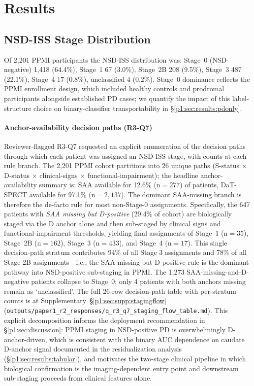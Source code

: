 \section{Results}
\label{p1:sec:results}

\subsection{NSD-ISS Stage Distribution}
Of 2{,}201 PPMI participants the NSD-ISS distribution was: Stage~0 (NSD-negative) 1{,}418 (64.4\%), Stage~1 67 (3.0\%), Stage~2B 208 (9.5\%), Stage~3 487 (22.1\%), Stage~4 17 (0.8\%), unclassified 4 (0.2\%). Stage~0 dominance reflects the PPMI enrollment design, which included healthy controls and prodromal participants alongside established PD cases; we quantify the impact of this label-structure choice on binary-classifier transportability in \S\ref{p1:sec:results:pdonly}.

\paragraph*{Anchor-availability decision paths (R3-Q7)} Reviewer-flagged R3-Q7 requested an explicit enumeration of the decision paths through which each patient was assigned an NSD-ISS stage, with counts at each rule branch. The 2{,}201 PPMI cohort partitions into 26 unique paths (S-status $\times$ D-status $\times$ clinical-signs $\times$ functional-impairment); the headline anchor-availability summary is: SAA available for 12.6\% (n${=}277$) of patients, DaT-SPECT available for 97.1\% (n${=}2{,}137$). The dominant SAA-missing branch is therefore the de-facto rule for most non-Stage-0 assignments. Specifically, the 647 patients with \emph{SAA missing but D-positive} (29.4\% of cohort) are biologically staged via the D anchor alone and then sub-staged by clinical signs and functional-impairment thresholds, yielding final assignments of Stage~1 (n${=}35$), Stage~2B (n${=}162$), Stage~3 (n${=}433$), and Stage~4 (n${=}17$). This single decision-path stratum contributes 94\% of all Stage 3 assignments and 78\% of all Stage 2B assignments---i.e., the SAA-missing-but-D-positive rule is the dominant pathway into NSD-positive sub-staging in PPMI. The 1{,}273 SAA-missing-and-D-negative patients collapse to Stage~0; only 4 patients with both anchors missing remain as `unclassified'. The full 26-row decision-path table with per-stratum counts is at Supplementary~\S\ref{p1:sec:supp:stagingflow} (\texttt{outputs/paper1\_r2\_responses/q\_r3\_q7\_staging\_flow\_table.md}). This explicit decomposition informs the deployment recommendation in \S\ref{p1:sec:discussion}: PPMI staging in NSD-positive PD is overwhelmingly D-anchor-driven, which is consistent with the binary AUC dependence on caudate D-anchor signal documented in the residualization analysis (\S\ref{p1:sec:results:tabular}), and motivates the two-stage clinical pipeline in which biological confirmation is the imaging-dependent entry point and downstream sub-staging proceeds from clinical features alone.

